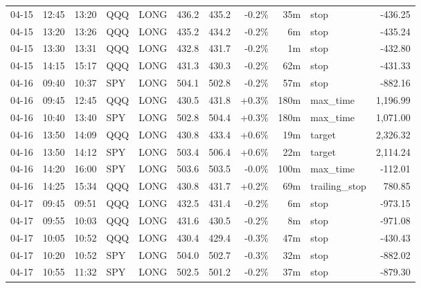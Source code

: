 \documentclass[11pt,a4paper,twoside]{article}
\begin{document}
\begin{center}
\begin{longtable}{>{\color{txtmain}}l l l l l r r r r >{\color{txtmain}}l r}
04-15 & 12:45 & 13:20 & QQQ & LONG & 436.2 & 435.2 & \textcolor{lossred}{-0.2\%} & 35m & stop & \textcolor{lossred}{-436.25} \\
04-15 & 13:20 & 13:26 & QQQ & LONG & 435.2 & 434.2 & \textcolor{lossred}{-0.2\%} & 6m & stop & \textcolor{lossred}{-435.24} \\
04-15 & 13:30 & 13:31 & QQQ & LONG & 432.8 & 431.7 & \textcolor{lossred}{-0.2\%} & 1m & stop & \textcolor{lossred}{-432.80} \\
04-15 & 14:15 & 15:17 & QQQ & LONG & 431.3 & 430.3 & \textcolor{lossred}{-0.2\%} & 62m & stop & \textcolor{lossred}{-431.33} \\
04-16 & 09:40 & 10:37 & SPY & LONG & 504.1 & 502.8 & \textcolor{lossred}{-0.2\%} & 57m & stop & \textcolor{lossred}{-882.16} \\
04-16 & 09:45 & 12:45 & QQQ & LONG & 430.5 & 431.8 & \textcolor{wingreen}{+0.3\%} & 180m & max\_time & \textcolor{wingreen}{1,196.99} \\
04-16 & 10:40 & 13:40 & SPY & LONG & 502.8 & 504.4 & \textcolor{wingreen}{+0.3\%} & 180m & max\_time & \textcolor{wingreen}{1,071.00} \\
04-16 & 13:50 & 14:09 & QQQ & LONG & 430.8 & 433.4 & \textcolor{wingreen}{+0.6\%} & 19m & target & \textcolor{wingreen}{2,326.32} \\
04-16 & 13:50 & 14:12 & SPY & LONG & 503.4 & 506.4 & \textcolor{wingreen}{+0.6\%} & 22m & target & \textcolor{wingreen}{2,114.24} \\
04-16 & 14:20 & 16:00 & SPY & LONG & 503.6 & 503.5 & \textcolor{lossred}{-0.0\%} & 100m & max\_time & \textcolor{lossred}{-112.01} \\
04-16 & 14:25 & 15:34 & QQQ & LONG & 430.8 & 431.7 & \textcolor{wingreen}{+0.2\%} & 69m & trailing\_stop & \textcolor{wingreen}{780.85} \\
04-17 & 09:45 & 09:51 & QQQ & LONG & 432.5 & 431.4 & \textcolor{lossred}{-0.2\%} & 6m & stop & \textcolor{lossred}{-973.15} \\
04-17 & 09:55 & 10:03 & QQQ & LONG & 431.6 & 430.5 & \textcolor{lossred}{-0.2\%} & 8m & stop & \textcolor{lossred}{-971.08} \\
04-17 & 10:05 & 10:52 & QQQ & LONG & 430.4 & 429.4 & \textcolor{lossred}{-0.3\%} & 47m & stop & \textcolor{lossred}{-430.43} \\
04-17 & 10:20 & 10:52 & SPY & LONG & 504.0 & 502.7 & \textcolor{lossred}{-0.3\%} & 32m & stop & \textcolor{lossred}{-882.02} \\
04-17 & 10:55 & 11:32 & SPY & LONG & 502.5 & 501.2 & \textcolor{lossred}{-0.2\%} & 37m & stop & \textcolor{lossred}{-879.30} \\

\end{longtable}
\end{center}
\end{document}
